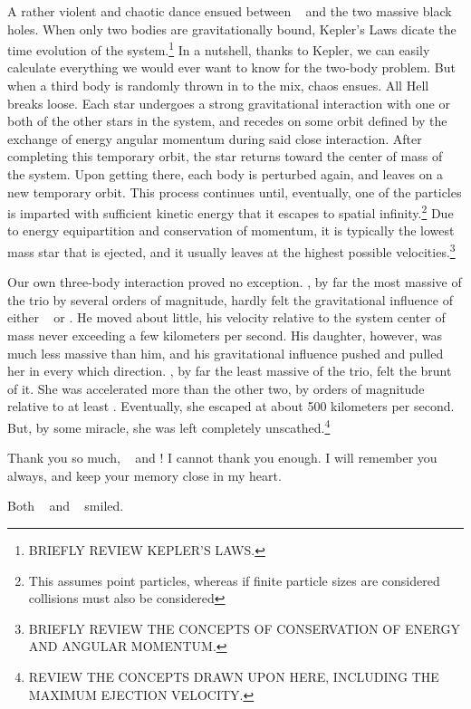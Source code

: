 \documentclass[main.tex]{subfiles}
\begin{document}
\newpara \nar A rather violent and chaotic dance ensued between \rmelectra~ and the two massive black holes.  When only two bodies are gravitationally bound, Kepler's Laws dicate the time evolution of the system.\footnote{BRIEFLY REVIEW KEPLER'S LAWS.}  In a nutshell, thanks to Kepler, we can easily calculate everything we would ever want to know for the two-body problem.  But when a third body is randomly thrown in to the mix, chaos ensues.  All Hell breaks loose.  Each star undergoes a strong gravitational interaction with one or both of the other stars in the system, and recedes on some orbit defined by the exchange of energy angular momentum during said close interaction.  After completing this temporary orbit, the star returns toward the center of mass of the system.  Upon getting there, each body is perturbed again, and leaves on a new temporary orbit.  This process continues until, eventually, one of the particles is imparted with sufficient kinetic energy that it escapes to spatial infinity.\footnote{This assumes point particles, whereas if finite particle sizes are considered collisions must also be considered}  Due to energy equipartition and conservation of momentum, it is typically the lowest mass star that is ejected, and it usually leaves at the highest possible velocities.\footnote{BRIEFLY REVIEW THE CONCEPTS OF CONSERVATION OF ENERGY AND ANGULAR MOMENTUM.}  

\newpara \nar Our own three-body interaction proved no exception.  \rmchiron, by far the most massive of the trio by several orders of magnitude, hardly felt the gravitational influence of either \rmelectra~ or \rmhippe.  He moved about little, his velocity relative to the system center of mass never exceeding a few kilometers per second.  His daughter, however, was much less massive than him, and his gravitational influence pushed and pulled her in every which direction.  \rmelectra, by far the least massive of the trio, felt the brunt of it.  She was accelerated more than the other two, by orders of magnitude relative to at least \rmchiron.  Eventually, she escaped at about 500 kilometers per second.  But, by some miracle, she was left completely unscathed.\footnote{REVIEW THE CONCEPTS DRAWN UPON HERE, INCLUDING THE MAXIMUM EJECTION VELOCITY.}

\newpara \Electra Thank you so much, \rmchiron~ and \rmhippe!  I cannot thank you enough.  I will remember you always, and keep your memory close in my heart.

\newpara \nar Both \rmchiron~ and \rmhippe~ smiled.
\end{document}
